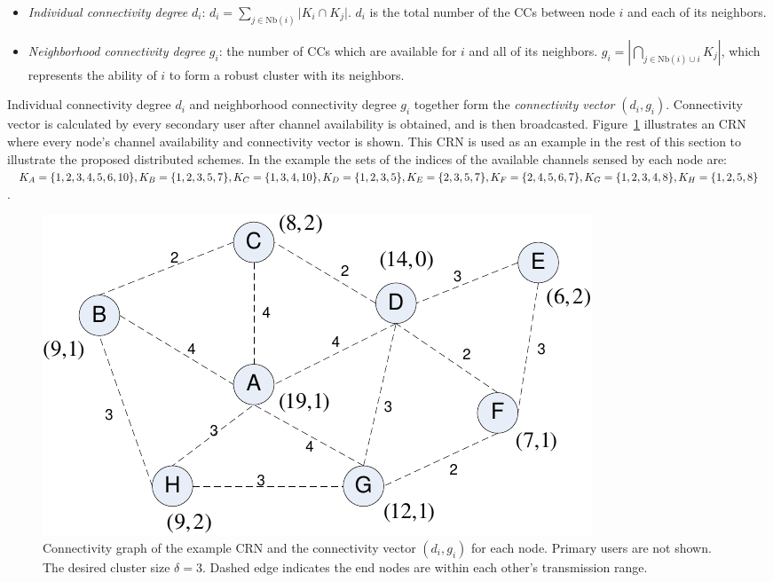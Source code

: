 \documentclass[times]{ettauth}
\theoremstyle{mytheoremstyle}
\theoremstyle{mytheoremstyle}
\theoremstyle{mytheoremstyle}
\begin{document}
\begin{itemize}

\item \textit{Individual connectivity degree} $d_i$: $d_i=\sum_{j\in \text{Nb}(i)}\vert K_i\cap K_j\vert$. 
$d_i$ is the total number of the CCs between node $i$ and each of its neighbors.

\item \textit{Neighborhood connectivity degree} $g_i$: the number of CCs which are available for $i$ and all of its neighbors.
$g_i=|\bigcap_{j\in \text{Nb}(i)\cup i}K_j|$, which represents the ability of $i$ to form a robust cluster with its neighbors.
\end{itemize}
Individual connectivity degree $d_i$ and neighborhood connectivity degree $g_i$ together form the \textit{connectivity vector} $(d_i, g_i)$.
Connectivity vector is calculated by every secondary user after channel availability is obtained, and is then broadcasted.
Figure~\ref{fig1} illustrates an CRN where every node's channel availability and connectivity vector is shown.
This CRN is used as an example in the rest of this section to illustrate the proposed distributed schemes.
In the example the sets of the indices of the available channels sensed by each node are: $K_A=\{1,2,3,4,5,6,10\}, K_B=\{1,2,3,5,7\}, \\K_C=\{1,3,4,10\}, K_D=\{1,2,3,5\}, \\K_E=\{2,3,5,7\}, K_F=\{2,4,5,6,7\}, \\K_G=\{1,2,3,4,8\}, K_H=\{1,2,5,8\}$.
\begin{figure}[ht!]
  \centering
\includegraphics[width=0.7\linewidth]{figure1.pdf}
	\caption{Connectivity graph of the example CRN and the connectivity vector $(d_i, g_i)$ for each node. Primary users are not shown. The desired cluster size $\delta =3$. Dashed edge indicates the end nodes are within each other's transmission range.}
	\label{fig1}
\end{figure}
\end{document}
